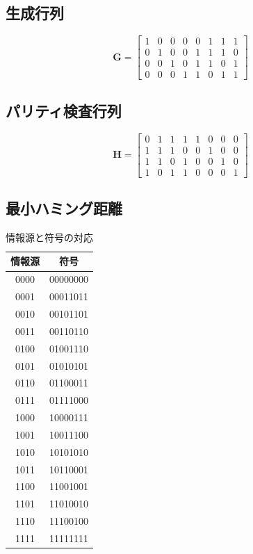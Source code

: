 \documentclass[a4paper,11pt]{jsarticle}
\begin{document}
\subsection{生成行列}
\begin{equation*}
  {\bm G}=
  \begin{bmatrix}
    1 & 0 & 0 & 0 & 0 & 1 & 1 & 1 \\
    0 & 1 & 0 & 0 & 1 & 1 & 1 & 0 \\
    0 & 0 & 1 & 0 & 1 & 1 & 0 & 1 \\
    0 & 0 & 0 & 1 & 1 & 0 & 1 & 1
  \end{bmatrix}
\end{equation*}

\subsection{パリティ検査行列}
\begin{equation}
  \label{eq:parity-check-matrix}
  {\bm H}=
  \begin{bmatrix}
    0 & 1 & 1 & 1 & 1 & 0 & 0 & 0 \\
    1 & 1 & 1 & 0 & 0 & 1 & 0 & 0 \\
    1 & 1 & 0 & 1 & 0 & 0 & 1 & 0 \\
    1 & 0 & 1 & 1 & 0 & 0 & 0 & 1
  \end{bmatrix}
\end{equation}

\subsection{最小ハミング距離}

\begin{table}[hbtp]
  \caption{情報源と符号の対応}
  \label{table:all-code}
  \centering
  \begin{tabular}{|cc|}
    \hline
    情報源 & 符号 \\ \hline \hline
    0000 & 00000000 \\ \hline
    0001 & 00011011 \\ \hline
    0010 & 00101101 \\ \hline
    0011 & 00110110 \\ \hline
    0100 & 01001110 \\ \hline
    0101 & 01010101 \\ \hline
    0110 & 01100011 \\ \hline
    0111 & 01111000 \\ \hline
    1000 & 10000111 \\ \hline
    1001 & 10011100 \\ \hline
    1010 & 10101010 \\ \hline
    1011 & 10110001 \\ \hline
    1100 & 11001001 \\ \hline
    1101 & 11010010 \\ \hline
    1110 & 11100100 \\ \hline
    1111 & 11111111 \\ \hline
  \end{tabular}
\end{table}
\end{document}
